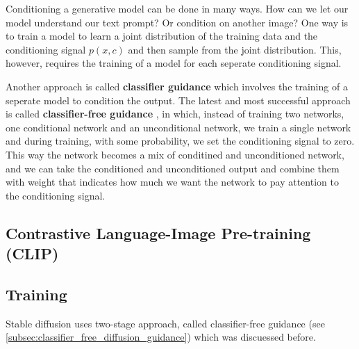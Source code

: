 \label{subsec:classifier_free_diffusion_guidance}

Conditioning a generative model can be done in many ways. How can we let our model understand our text prompt? Or condition on another image? One way is to train a model to learn a joint distribution of the training data and the conditioning signal $p(x,c)$ and then sample from the joint distribution. This, however, requires the training of a model for each seperate conditioning signal.

Another approach is called \textbf{classifier guidance} \cite{openai_diffusion_beats_gans} which involves the training of a seperate model to condition the output. The latest and most successful approach is called \textbf{classifier-free guidance} \cite{classifier_free_guidance}, in which, instead of training two networks, one conditional network and an unconditional network, we train a single network and during training, with some probability, we set the conditioning signal to zero. This way the network becomes a mix of conditined and unconditioned network, and we can take the conditioned and unconditioned output and combine them with weight that indicates how much we want the network to pay attention to the conditioning signal.






\subsection{Contrastive Language-Image Pre-training (CLIP)}

\label{subsec:clip}







\subsection{Training}

Stable diffusion uses two-stage approach, called classifier-free guidance (see \ref{subsec:classifier_free_diffusion_guidance}) which was discuessed before. 